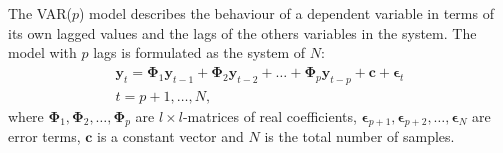 The VAR($p$) model describes the behaviour of a dependent variable in terms of
its own lagged values and the lags of the others variables in the system. The
model with $p$ lags is formulated as the system of $N$:
\begin{align}
\label{eq:var}
\mathbf{y}_t 
= \boldsymbol{\Phi}_1 \mathbf{y}_{t-1} +
  \boldsymbol{\Phi}_2 \mathbf{y}_{t-2} + \dots +
  \boldsymbol{\Phi}_p\mathbf{y}_{t-p} +
  \mathbf{c} + \boldsymbol{\epsilon}_t \nonumber \\
t=p+1,\dots,N,
\end{align}
\noindent where 
$\boldsymbol{\Phi}_1, \boldsymbol{\Phi}_2,\dots,\boldsymbol{\Phi}_p$
are $l\times l$-matrices of real coefficients,
$\boldsymbol{\epsilon}_{p+1},
 \boldsymbol{\epsilon}_{p+2}, \dots, \boldsymbol{\epsilon}_N$ 
are error terms, $\mathbf{c}$ is a constant vector and $N$ is the total
number of samples.

